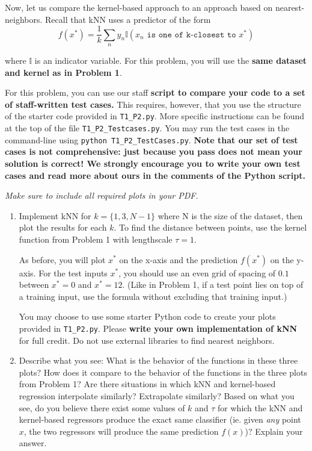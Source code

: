 \documentclass[submit]{harvardml}
\begin{document}
\begin{problem}

Now, let us compare the kernel-based approach to an approach based on
nearest-neighbors.  Recall that kNN uses a predictor of the form
  \begin{equation*}
    f(x^*) = \frac{1}{k} \sum_n y_n \mathbb{I}(x_n \texttt{ is one of k-closest to } x^*)
  \end{equation*}

\noindent where $\mathbb{I}$ is an indicator variable. For this problem, you will use the \textbf{same dataset and kernel as in Problem 1}.


For this problem, you can use our staff \textbf{script to compare your code to a set of staff-written test cases.} This requires, however, that you use the structure of the starter code provided in \texttt{T1\_P2.py}. More specific instructions can be found at the top of the file \texttt{T1\_P2\_Testcases.py}. You may run the test cases in the command-line using \texttt{python T1\_P2\_TestCases.py}.
\textbf{Note that our set of test cases is not comprehensive: just because you pass does not mean your solution is correct! We strongly encourage you to write your own test cases and read more about ours in the comments of the Python script.}

\vspace{0.5cm}
\noindent\emph{Make sure to include all required plots in your PDF.}


\begin{enumerate}

\item Implement kNN for $k=\{1, 3, N-1\}$ where N is the size of the dataset, then plot the results for each $k$. To find the distance between points, use the kernel function from Problem 1 with lengthscale $\tau=1$. 

As before, you will plot $x^*$ on the x-axis and the prediction $f(x^*)$ on the y-axis.  For the test inputs $x^*$, you should use an even grid of spacing of $0.1$ between $x^* = 0$ and $x^* = 12$.  (Like in Problem 1, if a test point lies on top of a training input, use the formula without excluding that training input.)
  
  You may choose to use some starter Python code to create your plots
  provided in \verb|T1_P2.py|.  Please \textbf{write your own
    implementation of kNN} for full credit.  Do not use external
  libraries to find nearest neighbors.
  
\item Describe what you see: What is the behavior of the functions in
  these three plots?  How does it compare to the behavior of the
  functions in the three plots from Problem 1?  Are there situations
  in which kNN and kernel-based regression interpolate similarly?
  Extrapolate similarly?  Based on what you see, do you believe there
  exist some values of $k$ and $\tau$ for which the kNN and kernel-based regressors produce the exact same classifier (ie. given \textit{any} point $x$, the two regressors will produce the same prediction $f(x)$)? Explain your answer.
  

\end{enumerate}
\end{problem}
\end{document}
